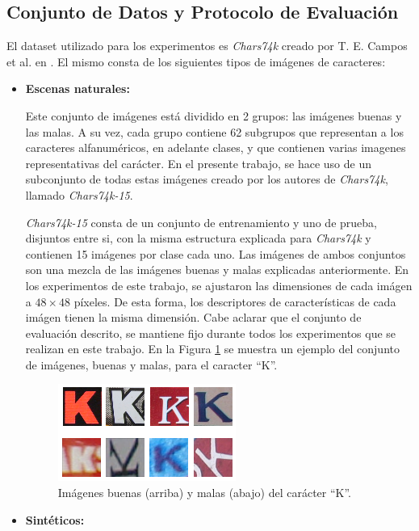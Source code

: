 \subsection{Conjunto de Datos y Protocolo de Evaluación}
\label{subsection:evaluacion}


	El dataset utilizado para los experimentos es \textit{Chars74k} creado por T. E. Campos et al. en \cite{dCBV09}. El mismo consta de los siguientes tipos de imágenes de caracteres: 
	\begin{itemize}
		\item \textbf{Escenas naturales:}
		
		Este conjunto de imágenes está dividido en 2 grupos: las imágenes buenas y las malas. A su vez, cada grupo contiene 62 subgrupos que representan a los caracteres alfanuméricos, en adelante clases, y que contienen varias imagenes representativas del carácter. En el presente trabajo, se hace uso de un subconjunto de todas estas imágenes creado por los autores de \textit{Chars74k}, llamado \textit{Chars74k-15}.
		
		\textit{Chars74k-15} consta de un conjunto de entrenamiento y uno de prueba, disjuntos entre si, con la misma estructura explicada para \textit{Chars74k} y contienen 15 imágenes por clase cada uno. Las imágenes de ambos conjuntos son una mezcla de las imágenes buenas y malas explicadas anteriormente. En los experimentos de este trabajo, se ajustaron las dimensiones de cada imágen a $48 \times 48$ píxeles. De esta forma, los descriptores de características de cada imágen tienen la misma dimensión. Cabe aclarar que el conjunto de evaluación descrito, se mantiene fijo durante todos los experimentos que se realizan en este trabajo. En la Figura \ref{fig: chars74k-reales} se muestra un ejemplo del conjunto de imágenes, buenas y malas, para el caracter ``K''.
		\begin{figure}[htbp]
			\centering
				\includegraphics[scale=1]{img/img_buenas_malas.png}
				\caption[Chars74k reales]{Imágenes buenas (arriba) y malas (abajo) del carácter ``K''.}
			\label{fig: chars74k-reales}
		\end{figure}	
		
	\item \textbf{Sintéticos:}
	

\end{itemize}
